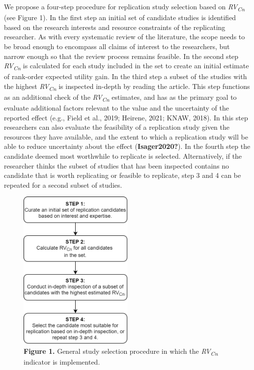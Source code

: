 \documentclass[
  man,floatsintext]{apa6}
\begin{document}
We propose a four-step procedure for replication study selection based on \emph{RV\textsubscript{Cn}} (see Figure 1). In the first step an initial set of candidate studies is identified based on the research interests and resource constraints of the replicating researcher. As with every systematic review of the literature, the scope needs to be broad enough to encompass all claims of interest to the researchers, but narrow enough so that the review process remains feasible. In the second step \emph{RV\textsubscript{Cn}} is calculated for each study included in the set to create an initial estimate of rank-order expected utility gain. In the third step a subset of the studies with the highest \emph{RV\textsubscript{Cn}} is inspected in-depth by reading the article. This step functions as an additional check of the \emph{RV\textsubscript{Cn}} estimates, and has as the primary goal to evaluate additional factors relevant to the value and the uncertainty of the reported effect (e.g., Field et al., 2019; Heirene, 2021; KNAW, 2018). In this step researchers can also evaluate the feasibility of a replication study given the resources they have available, and the extent to which a replication study will be able to reduce uncertainty about the effect (\textbf{Isager2020?}). In the fourth step the candidate deemed most worthwhile to replicate is selected. Alternatively, if the researcher thinks the subset of studies that has been inspected contains no candidate that is worth replicating or feasible to replicate, step 3 and 4 can be repeated for a second subset of studies.

\begin{figure}
\centering
\includegraphics[width=0.5\textwidth,height=\textheight]{Figure_1.png}
\caption{\textbf{Figure 1.} General study selection procedure in which the \emph{RV\textsubscript{Cn}} indicator is implemented.}
\end{figure}
\end{document}
